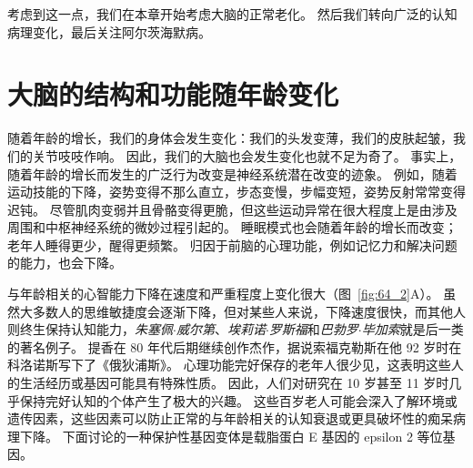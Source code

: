 考虑到这一点，我们在本章开始考虑大脑的正常老化。
然后我们转向广泛的认知病理变化，最后关注阿尔茨海默病。



\section{大脑的结构和功能随年龄变化}

随着年龄的增长，我们的身体会发生变化：我们的头发变薄，我们的皮肤起皱，我们的关节吱吱作响。
因此，我们的大脑也会发生变化也就不足为奇了。
事实上，随着年龄的增长而发生的广泛行为改变是神经系统潜在改变的迹象。
例如，随着运动技能的下降，姿势变得不那么直立，步态变慢，步幅变短，姿势反射常常变得迟钝。
尽管肌肉变弱并且骨骼变得更脆，但这些运动异常在很大程度上是由涉及周围和中枢神经系统的微妙过程引起的。
睡眠模式也会随着年龄的增长而改变；
老年人睡得更少，醒得更频繁。
归因于前脑的心理功能，例如记忆力和解决问题的能力，也会下降。


与年龄相关的心智能力下降在速度和严重程度上变化很大（图~\ref{fig:64_2}A）。
虽然大多数人的思维敏捷度会逐渐下降，但对某些人来说，下降速度很快，而其他人则终生保持认知能力，\textit{朱塞佩$\cdot$威尔第}、\textit{埃莉诺$\cdot$罗斯福}和\textit{巴勃罗$\cdot$毕加索}就是后一类的著名例子。
提香在 80 年代后期继续创作杰作，据说索福克勒斯在他 92 岁时在科洛诺斯写下了《俄狄浦斯》。
心理功能完好保存的老年人很少见，这表明这些人的生活经历或基因可能具有特殊性质。
因此，人们对研究在 10 岁甚至 11 岁时几乎保持完好认知的个体产生了极大的兴趣。
这些百岁老人可能会深入了解环境或遗传因素，这些因素可以防止正常的与年龄相关的认知衰退或更具破坏性的痴呆病理下降。
下面讨论的一种保护性基因变体是载脂蛋白 E 基因的 epsilon 2 等位基因。


